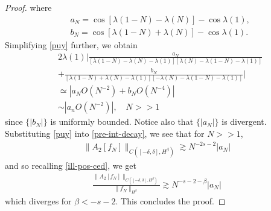 \documentclass[12pt,reqno]{amsart}
\numberwithin{equation}{section}  %
\begin{document}
\begin{proof}
%
%
where
%
%
\begin{equation*}
\begin{split}
  & a_{N} =   \cos[\lambda(1-N) - \lambda(N)] - \cos \lambda(1),
  \\
  & b_{N} =  \cos[\lambda(1-N) + \lambda(N)] - \cos \lambda(1).
\end{split}
\end{equation*}
%
Simplifying \eqref{puy} further, we obtain
%
%
\begin{equation*}
\begin{split}
  & 2 \lambda(1) \bigg |  \frac{a_{N}}{[\lambda(1-N) - \lambda(N) - \lambda(1)][\lambda(N) - \lambda(1-N) - \lambda(1)]} 
  \\
  & +  \frac{b_{N}}{[\lambda(1-N) + \lambda(N) - \lambda(1)][-\lambda(N) - \lambda(1-N) - \lambda(1)]} 
   \bigg |
   \\
   & \simeq | a_{N} O(N^{-2}) + b_{N} O(N^{-4}) | 
   \\
   & \sim | a_{n} O(N^{-2})|, \quad N > >1
\end{split}
\end{equation*}
%
since $\{|b_{N}|\}$ is uniformly bounded. Notice also that $\{|a_{N}|\}$ is divergent. Substituting \eqref{puy} into \eqref{pre-int-decay}, we see that for $N > > 1$,  
%
%
\begin{equation*}
\begin{split}
\|A_{2}[f_{N}]\|_{C( [-\delta, \delta], H^{\beta})}
\gtrsim N^{-2 s -2}|a_{N}| 
\end{split}
\end{equation*}
%
%
and so recalling \eqref{ill-pos-ced}, we get
%
%
\begin{equation*}
\begin{split}
\frac{\|A_{2}[f_{N}]\|_{C([-\delta, \delta], H^{\beta})}}{\| f_{N}
\|_{H^{\beta}}} \gtrsim N^{-s -2 - \beta} | a_{N} |
\end{split}
\end{equation*}
%
%
which diverges for $\beta < -s -2$. This concludes the proof.
%
%
%
%
%
\end{proof}
%
%
%
%
%
%
%
\end{document}
